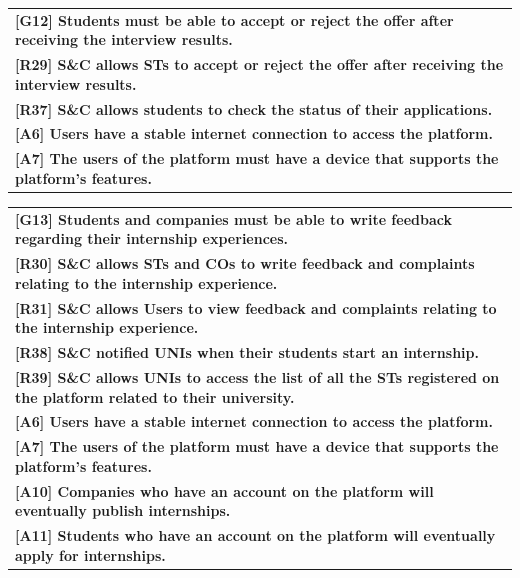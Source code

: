 \begin{center}
    \begin{tabular}{|p{37em}|}
        \rowcolor{bluepoli!40} %
        \hline
        \textbf{[G12] Students must be able to accept or reject the offer after receiving the interview results.} \\
        \rowcolor{bluepoli!15}
        \textbf{[R29] S\&C allows STs to accept or reject the offer after receiving the interview results.} \\
        \rowcolor{bluepoli!15}
        \textbf{[R37] S\&C allows students to check the status of their applications.} \\
        \textbf{[A6] Users have a stable internet connection to access the platform.}\\
        \textbf{[A7] The users of the platform must have a device that supports the platform's features.}\\
        \hline
    \end{tabular}
\end{center}

\begin{center}
    \begin{tabular}{|p{37em}|}
        \rowcolor{bluepoli!40} %
        \hline
        \textbf{[G13] Students and companies must be able to write feedback regarding their internship experiences.} \\
        \rowcolor{bluepoli!15}
        \textbf{[R30] S\&C allows STs and COs to write feedback and complaints relating to the internship experience.} \\
        \rowcolor{bluepoli!15}
        \textbf{[R31] S\&C allows Users to view feedback and complaints relating to the internship experience.} \\
        \rowcolor{bluepoli!15}
        \textbf{[R38] S\&C notified UNIs when their students start an internship.} \\
        \rowcolor{bluepoli!15}
        \textbf{[R39] S\&C allows UNIs to access the list of all the STs registered on the platform related to their university.} \\
        \textbf{[A6] Users have a stable internet connection to access the platform.}\\
        \textbf{[A7] The users of the platform must have a device that supports the platform's features.}\\
        \textbf{[A10] Companies who have an account on the platform will eventually publish internships.}\\
        \textbf{[A11] Students who have an account on the platform will eventually apply for internships.}\\
        \hline
    \end{tabular}
\end{center}

